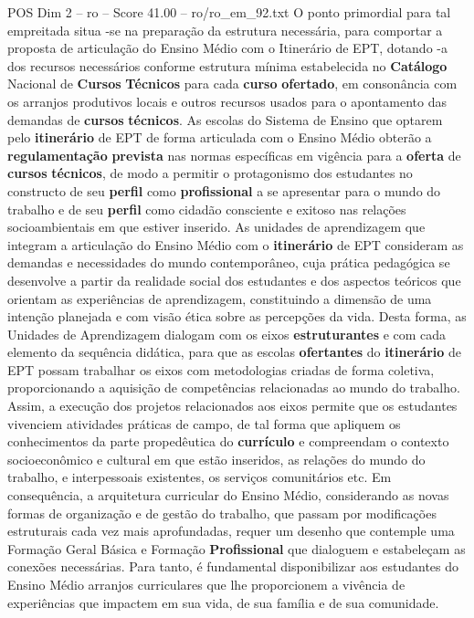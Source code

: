 \begin{textsample}{POS Dim 2 – ro – Score 41.00 – ro/ro\_em\_92.txt}
O ponto primordial para tal empreitada situa -se na preparação da estrutura necessária, para comportar a proposta de articulação do Ensino Médio com o Itinerário de EPT, dotando -a dos recursos necessários conforme estrutura mínima estabelecida no \textbf{Catálogo} Nacional de \textbf{Cursos} \textbf{Técnicos} para cada \textbf{curso} \textbf{ofertado}, em consonância com os arranjos produtivos locais e outros recursos usados para o apontamento das demandas de \textbf{cursos} \textbf{técnicos}.
As escolas do Sistema de Ensino que optarem pelo \textbf{itinerário} de EPT de forma articulada com o Ensino Médio obterão a \textbf{regulamentação} \textbf{prevista} nas normas específicas em vigência para a \textbf{oferta} de \textbf{cursos} \textbf{técnicos}, de modo a permitir o protagonismo dos estudantes no constructo de seu \textbf{perfil} como \textbf{profissional} a se apresentar para o mundo do trabalho e de seu \textbf{perfil} como cidadão consciente e exitoso nas relações socioambientais em que estiver inserido.
As unidades de aprendizagem que integram a articulação do Ensino Médio com o \textbf{itinerário} de EPT consideram as demandas e necessidades do mundo contemporâneo, cuja prática pedagógica se desenvolve a partir da realidade social dos estudantes e dos aspectos teóricos que orientam as experiências de aprendizagem, constituindo a dimensão de uma intenção planejada e com visão ética sobre as percepções da vida.
Desta forma, as Unidades de Aprendizagem dialogam com os eixos \textbf{estruturantes} e com cada elemento da sequência didática, para que as escolas \textbf{ofertantes} do \textbf{itinerário} de EPT possam trabalhar os eixos com metodologias criadas de forma coletiva, proporcionando a aquisição de competências relacionadas ao mundo do trabalho.
Assim, a execução dos projetos relacionados aos eixos permite que os estudantes vivenciem atividades práticas de campo, de tal forma que apliquem os conhecimentos da parte propedêutica do \textbf{currículo} e compreendam o contexto socioeconômico e cultural em que estão inseridos, as relações do mundo do trabalho, e interpessoais existentes, os serviços comunitários etc.
Em consequência, a arquitetura curricular do Ensino Médio, considerando as novas formas de organização e de gestão do trabalho, que passam por modificações estruturais cada vez mais aprofundadas, requer um desenho que contemple uma Formação Geral Básica e Formação \textbf{Profissional} que dialoguem e estabeleçam as conexões necessárias.
Para tanto, é fundamental disponibilizar aos estudantes do Ensino Médio arranjos curriculares que lhe proporcionem a vivência de experiências que impactem em sua vida, de sua família e de sua comunidade.

\end{textsample}
